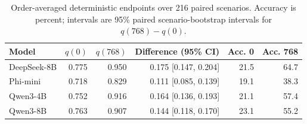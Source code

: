\begin{table}[H]
\centering
\caption{Order-averaged deterministic endpoints over 216 paired scenarios. Accuracy is percent; intervals are 95\% paired scenario-bootstrap intervals for $q(768)-q(0)$.}
\label{tab:crossmodel}
\small
\setlength{\tabcolsep}{3.5pt}
\begin{tabular}{lrrrrr}
\toprule
Model & $q(0)$ & $q(768)$ & Difference (95\% CI) & Acc. 0 & Acc. 768 \\
\midrule
DeepSeek-8B & 0.775 & 0.950 & 0.175 [0.147, 0.204] & 21.5 & 64.7 \\
Phi-mini & 0.718 & 0.829 & 0.111 [0.085, 0.139] & 19.1 & 38.3 \\
Qwen3-4B & 0.752 & 0.916 & 0.164 [0.136, 0.193] & 21.1 & 57.4 \\
Qwen3-8B & 0.763 & 0.907 & 0.144 [0.118, 0.170] & 23.1 & 55.2 \\
\bottomrule
\end{tabular}
\end{table}
